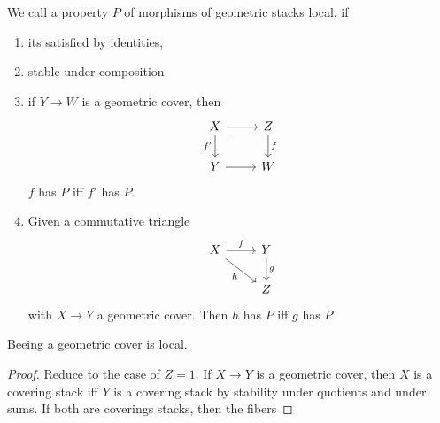 \documentclass{article}
\begin{document}
\begin{definition}
	We call a property $P$ of morphisms of geometric stacks local, if 
	\begin{enumerate}
		\item its satisfied by identities,
		\item stable under composition 
		\item if $Y \to W$ is a geometric cover, then 
			\[\begin{tikzcd}
				X & Z \\
				Y & W
				\arrow[from=1-1, to=1-2]
				\arrow["{f'}"', from=1-1, to=2-1]
				\arrow["\ulcorner"{anchor=center, pos=0.125}, draw=none, from=1-1, to=2-2]
				\arrow["f", from=1-2, to=2-2]
				\arrow[from=2-1, to=2-2]
			\end{tikzcd}\]
		$f$ has $P$ iff $f'$ has $P$.
		\item
	Given a commutative triangle%
	\[\begin{tikzcd}
		X & Y \\
		& Z
		\arrow["f", from=1-1, to=1-2]
		\arrow["h"', from=1-1, to=2-2]
		\arrow["g", from=1-2, to=2-2]
	\end{tikzcd}\]
with $X \to Y$ a geometric cover. Then $h$ has $P$ iff $g$ has $P$
\end{enumerate}
\end{definition}
\begin{lemma}
	Beeing a geometric cover is local.
\end{lemma}
\begin{proof}
	Reduce to the case of $Z = 1$. If $X \to Y$ is a geometric cover, then $X$ is a covering stack iff $Y$ is a covering stack by stability under quotients and under sums. If both are coverings stacks, then the fibers 
\end{proof}
\end{document}
